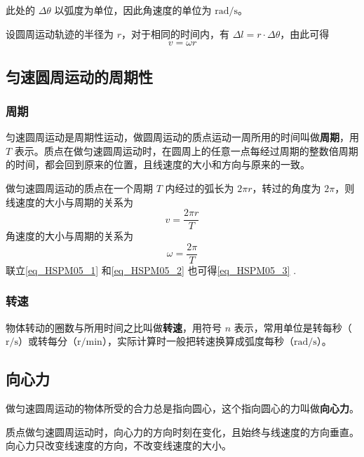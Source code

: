 此处的 $\Delta \theta$ 以弧度为单位，因此角速度的单位为 $\mathrm{rad/s}$。

设圆周运动轨迹的半径为 $r$，对于相同的时间内，有 $\Delta l=r \cdot \Delta \theta$，由此可得
\begin{equation}\label{eq_HSPM05_3}
v=\omega r
\end{equation}

\subsection{匀速圆周运动的周期性}

\subsubsection{周期}

匀速圆周运动是周期性运动，做圆周运动的质点运动一周所用的时间叫做\textbf{周期}，用 $T$ 表示。质点在做匀速圆周运动时，在圆周上的任意一点每经过周期的整数倍周期的时间，都会回到原来的位置，且线速度的大小和方向与原来的一致。

做匀速圆周运动的质点在一个周期 $T$ 内经过的弧长为 $2\pi r$，转过的角度为 $2\pi$，则线速度的大小与周期的关系为
\begin{equation}\label{eq_HSPM05_1}
v=\frac{2\pi r}{T}
\end{equation}
角速度的大小与周期的关系为
\begin{equation}\label{eq_HSPM05_2}
\omega = \frac{2\pi}{T}
\end{equation}
联立\autoref{eq_HSPM05_1} 和\autoref{eq_HSPM05_2} 也可得\autoref{eq_HSPM05_3} .

\subsubsection{转速}

物体转动的圈数与所用时间之比叫做\textbf{转速}，用符号 $n$ 表示，常用单位是转每秒（$\mathrm{r/s}$）或转每分（$\mathrm{r/min}$），实际计算时一般把转速换算成弧度每秒（$\mathrm{rad/s}$）。

\subsection{向心力}

做匀速圆周运动的物体所受的合力总是指向圆心，这个指向圆心的力叫做\textbf{向心力}。

质点做匀速圆周运动时，向心力的方向时刻在变化，且始终与线速度的方向垂直。向心力只改变线速度的方向，不改变线速度的大小。


